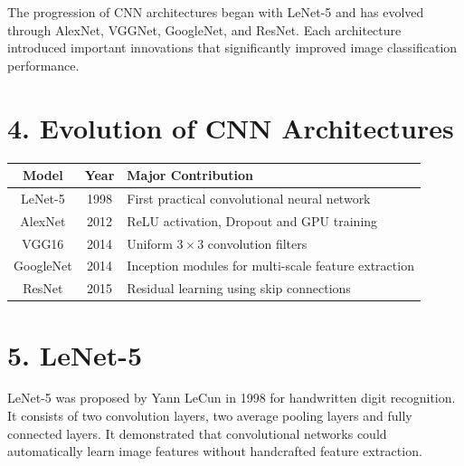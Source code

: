 \documentclass[11pt]{article}
\begin{document}
The progression of CNN architectures began with LeNet-5 and has evolved
through AlexNet, VGGNet, GoogleNet, and ResNet. Each architecture
introduced important innovations that significantly improved image
classification performance.


\section*{4. Evolution of CNN Architectures}

\begin{center}

\begin{tabular}{|c|c|p{7cm}|}

\hline

Model & Year & Major Contribution\\

\hline

LeNet-5 & 1998 &
First practical convolutional neural network\\

\hline

AlexNet & 2012 &
ReLU activation, Dropout and GPU training\\

\hline

VGG16 & 2014 &
Uniform $3\times3$ convolution filters\\

\hline

GoogleNet & 2014 &
Inception modules for multi-scale feature extraction\\

\hline

ResNet & 2015 &
Residual learning using skip connections\\

\hline

\end{tabular}

\end{center}


\section*{5. LeNet-5}

LeNet-5 was proposed by Yann LeCun in 1998 for handwritten digit
recognition. It consists of two convolution layers, two average pooling
layers and fully connected layers. It demonstrated that convolutional
networks could automatically learn image features without handcrafted
feature extraction.
\end{document}
